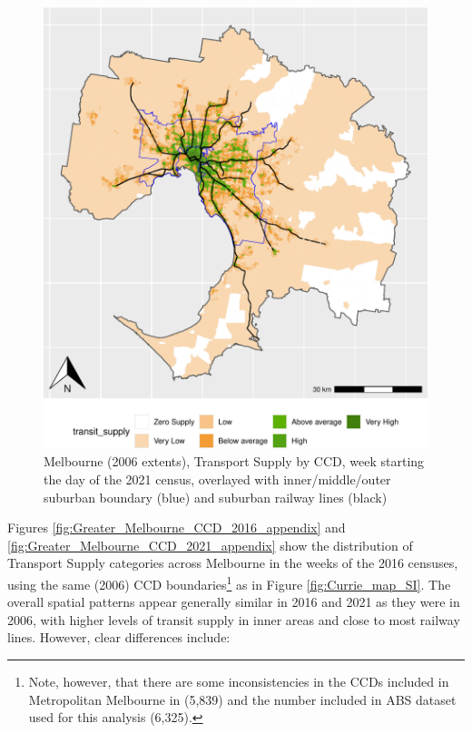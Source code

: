 \documentclass[preprint, 3p,
authoryear]{elsarticle} %
\begin{document}
\begin{figure}
\centering
\includegraphics{Leveraging_GTFS_to_assess_transit_supply_Transport_Geography_files/figure-latex/Greater_Melbourne_CCD_2021_appendix-1.pdf}
\caption{Melbourne (2006 extents), Transport Supply by CCD, week
starting the day of the 2021 census, overlayed with inner/middle/outer
suburban boundary (blue) and suburban railway lines (black)}
\end{figure}

Figures \ref{fig:Greater_Melbourne_CCD_2016_appendix} and
\ref{fig:Greater_Melbourne_CCD_2021_appendix} show the distribution of
Transport Supply categories across Melbourne in the weeks of the 2016
censuses, using the same (2006) CCD boundaries\footnote{Note, however,
  that there are some inconsistencies in the CCDs included in
  Metropolitan Melbourne in \citet{currie2010identifying} (5,839) and
  the number included in ABS dataset used for this analysis (6,325).} as
in Figure \ref{fig:Currie_map_SI}. The overall spatial patterns appear
generally similar in 2016 and 2021 as they were in 2006, with higher
levels of transit supply in inner areas and close to most railway lines.
However, clear differences include:
\end{document}
